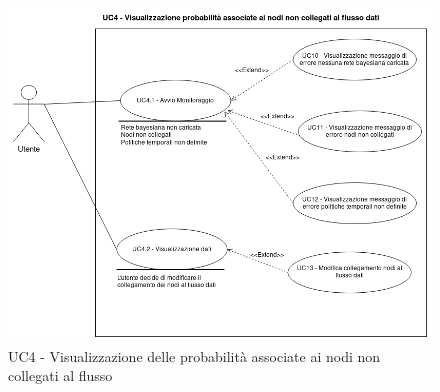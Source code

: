 \begin{figure}[H]
\centering
\includegraphics[scale=0.4]{./images/UC4.png}
\caption{UC4 - Visualizzazione delle probabilità associate ai nodi non collegati al flusso}
\end{figure}

